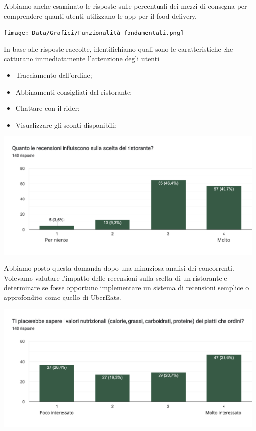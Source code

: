 \documentclass{article}
\begin{document}
\par Abbiamo anche esaminato le risposte sulle percentuali dei mezzi di consegna per comprendere quanti utenti utilizzano le app per il food delivery.\par \vspace{1cm}
\texttt{[image: Data/Grafici/Funzionalità\_fondamentali.png]}\par
In base alle risposte raccolte, identifichiamo quali sono le caratteristiche che catturano immediatamente l'attenzione degli utenti.
\par \begin{itemize}
    \item Tracciamento dell'ordine;
    \item Abbinamenti consigliati dal ristorante;
    \item Chattare con il rider;
    \item Visualizzare gli sconti disponibili;
\end{itemize}   \vspace{1cm} \par
\includegraphics[width=\textwidth]{Data/Grafici/influenza_recensioni.png}
\par Abbiamo posto questa domanda dopo una minuziosa analisi dei concorrenti. Volevamo valutare l'impatto delle recensioni sulla scelta di un ristorante e determinare se fosse opportuno implementare un sistema di recensioni semplice o approfondito come quello di UberEats.
    \par \vspace{1cm}\includegraphics[width=\textwidth]{Data/Grafici/val_nutrizionali.png}\par
\end{document}
